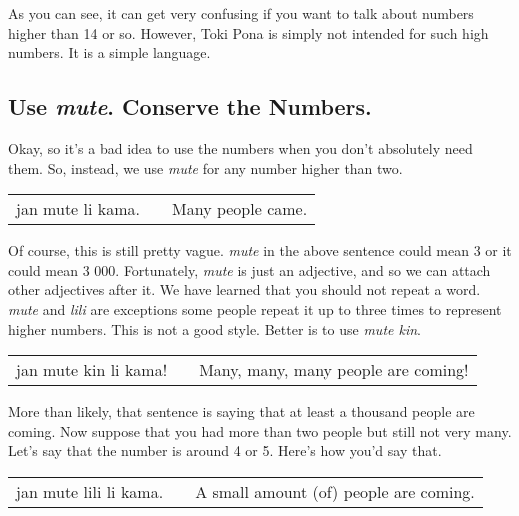 As you can see, it can get very confusing if you want to talk about numbers higher than 14 or so.
However, Toki Pona is simply not intended for such high numbers. 
It is a simple language. 
%
{}
\subsection*{Use \textit{mute}. Conserve the Numbers.}
%
Okay, so it's a bad idea to use the numbers when you don't absolutely need them. 
So, instead, we use \textit{mute} for any number higher than two.

\begin{supertabular}{p{5,5cm}|ll}
jan mute li kama. && Many people came. \\
\end{supertabular} 

Of course, this is still pretty vague. 
\textit{mute} in the above sentence could mean 3 or it could mean 3 000. 
Fortunately, \textit{mute} is just an adjective, and so we can attach other adjectives after it. 
We have learned that you should not repeat a word. \textit{mute} and \textit{lili} are exceptions some people repeat it up to three times to represent higher numbers. 
This is not a good style. 
Better is to use \textit{mute kin}. 

\begin{supertabular}{p{5,5cm}|ll}
jan mute kin li kama! && Many, many, many people are coming! \\
\end{supertabular} 

More than likely, that sentence is saying that at least a thousand people are coming.  
Now suppose that you had more than two people but still not very many. 
Let's say that the number is around 4 or 5. Here's how you'd say that. 

\begin{supertabular}{p{5,5cm}|ll}
jan mute lili li kama. && A small amount (of) people are coming. \\
\end{supertabular} 
%
